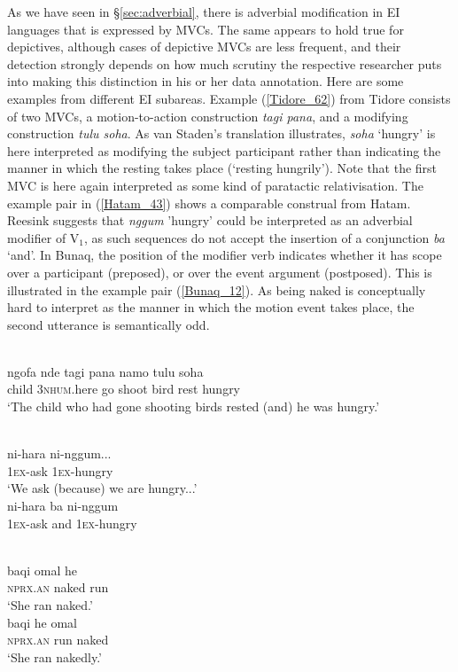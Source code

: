 As we have seen in §\ref{sec:adverbial}, there is adverbial modification in EI languages that is expressed by MVCs. The same appears to hold true for depictives, although cases of depictive MVCs are less frequent, and their detection strongly depends on how much scrutiny the respective researcher puts into making this distinction in his or her data annotation. Here are some examples from different EI subareas. Example (\ref{Tidore_62}) from Tidore consists of two MVCs, a motion-to-action construction \textit{tagi pana}, and a modifying construction \textit{tulu soha}. As van Staden's translation illustrates, \textit{soha} `hungry' is here interpreted as modifying the subject participant rather than indicating the manner in which the resting takes place (`resting hungrily'). Note that the first MVC is here again interpreted as some kind of paratactic relativisation. The example pair in (\ref{Hatam_43}) shows a comparable construal from Hatam. Reesink suggests that \textit{nggum} 'hungry' could be interpreted as an adverbial modifier of V$_1$, as such sequences do not accept the insertion of a conjunction \textit{ba} `and'. In Bunaq, the position of the modifier verb indicates whether it has scope over a participant (preposed), or over the event argument (postposed). This is illustrated in the example pair (\ref{Bunaq_12}). As being naked is conceptually hard to interpret as the manner in which the motion event takes place, the second utterance is semantically odd.

\ea \label{Tidore_62}
\\
\gll ngofa nde tagi pana namo tulu soha \\
child 3\textsc{nhum}.here go shoot bird rest hungry \\
\glft `The child who had gone shooting birds rested (and) he was hungry.'\\ 
\z

\ea \label{Hatam_43}
\\
\ea
\gll ni-hara ni-nggum... \\
1\textsc{ex}-ask 1\textsc{ex}-hungry \\
\glft `We ask (because) we are hungry...' \\ 
\ex
\gll *ni-hara ba ni-nggum \\ 
1\textsc{ex}-ask and 1\textsc{ex}-hungry \\
\z
\z

\ea \label{Bunaq_12}
\\
\ea
\gll baqi omal he \\
\textsc{nprx}.\textsc{an} naked run \\
\glft `She ran naked.' \\ 
\ex
\gll baqi he omal \\ 
\textsc{nprx}.\textsc{an} run naked \\
\glft `She ran nakedly.' \\ 
\z
\z


